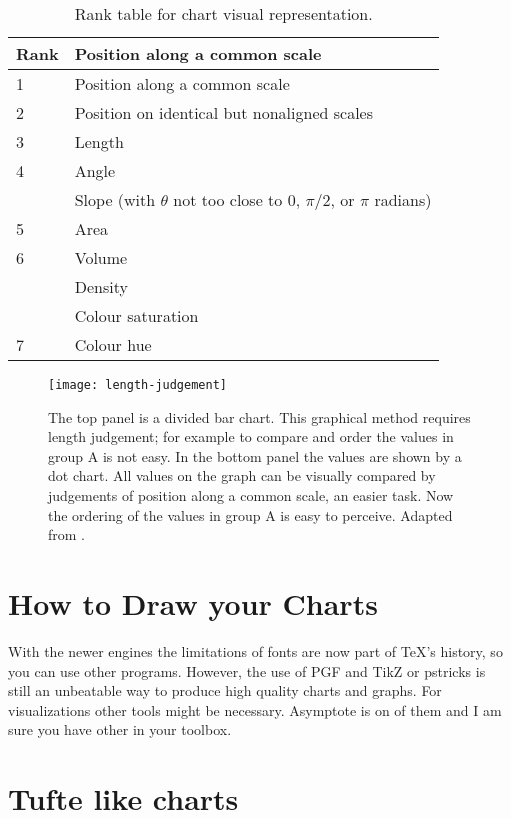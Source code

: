 \begin{table}[htbp]
\centering

\begin{tabular}{lp{4.5cm}}
\toprule
Rank  & Position along a common scale\\
\midrule
1  & Position along a common scale\\
2  & Position on identical but nonaligned scales\\
3  & Length\\
4  & Angle\\
    & Slope (with $\theta$ not too close to 0, $\pi/2$, or $\pi$ radians)\\
5   & Area\\
6   &Volume\\
     &Density\\
     &Colour saturation\\
7   & Colour hue\\         
\bottomrule
\end{tabular}
\caption{Rank table for chart visual representation.}
\end{table}



\begin{figure}[htbp]
\texttt{[image: length-judgement]}
\caption{The top panel is a divided bar chart. This graphical method requires length judgement; for example
to compare and order the values in group A is not easy. In the bottom panel the values are shown by a dot
chart. All values on the graph can be visually compared by judgements of position along a common scale, an
easier task. Now the ordering of the values in group A is easy to perceive. Adapted from \cite{cleveland1985}.}
\end{figure}

\section{How to Draw your Charts}

With the newer engines the limitations of fonts are now part of TeX’s history, so you can use other programs. However, the use of PGF and TikZ or pstricks is still an unbeatable way to produce high quality charts and graphs.
For visualizations other tools might be necessary. Asymptote is on of them and I am sure you have other in your toolbox.

\section{Tufte like charts}

